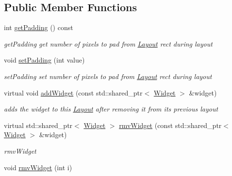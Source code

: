 \subsection*{Public Member Functions}
\begin{DoxyCompactItemize}
\item 
int \hyperlink{classcanvascv_1_1AutoLayout_ade56b6a9186982fcf5fdcfbf39ac48df}{get\+Padding} () const 
\begin{DoxyCompactList}\small\item\em get\+Padding get number of pixels to pad from \hyperlink{classcanvascv_1_1Layout}{Layout} rect during layout \end{DoxyCompactList}\item 
void \hyperlink{classcanvascv_1_1AutoLayout_ab288ea25db0cdfe13887fdff4df1ac43}{set\+Padding} (int value)
\begin{DoxyCompactList}\small\item\em set\+Padding set number of pixels to pad from \hyperlink{classcanvascv_1_1Layout}{Layout} rect during layout \end{DoxyCompactList}\item 
virtual void \hyperlink{classcanvascv_1_1AutoLayout_a2f5bf030889e0792acc8f10d7b0ac191}{add\+Widget} (const std\+::shared\+\_\+ptr$<$ \hyperlink{classcanvascv_1_1Widget}{Widget} $>$ \&widget)\hypertarget{classcanvascv_1_1AutoLayout_a2f5bf030889e0792acc8f10d7b0ac191}{}\label{classcanvascv_1_1AutoLayout_a2f5bf030889e0792acc8f10d7b0ac191}

\begin{DoxyCompactList}\small\item\em adds the widget to this \hyperlink{classcanvascv_1_1Layout}{Layout} after removing it from it\textquotesingle{}s previous layout \end{DoxyCompactList}\item 
virtual std\+::shared\+\_\+ptr$<$ \hyperlink{classcanvascv_1_1Widget}{Widget} $>$ \hyperlink{classcanvascv_1_1AutoLayout_abc436c90f50a5331c391e351bef9e659}{rmv\+Widget} (const std\+::shared\+\_\+ptr$<$ \hyperlink{classcanvascv_1_1Widget}{Widget} $>$ \&widget)
\begin{DoxyCompactList}\small\item\em rmv\+Widget \end{DoxyCompactList}\item 
void \hyperlink{classcanvascv_1_1AutoLayout_a2e518f91b260856c3e22fcb7c61e841d}{rmv\+Widget} (int i)\hypertarget{classcanvascv_1_1AutoLayout_a2e518f91b260856c3e22fcb7c61e841d}{}\label{classcanvascv_1_1AutoLayout_a2e518f91b260856c3e22fcb7c61e841d}


\end{DoxyCompactItemize}
